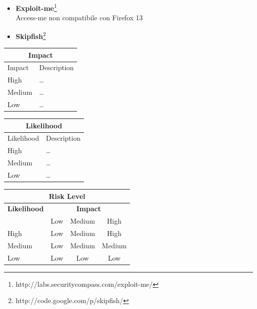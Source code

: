 \documentclass{article}
\begin{document}
\begin{itemize}
Sono state individuate in tutto 57 vulnerabilità.
Ognuna delle vulnerabilità segnala che, ad una richiesta particolare, il server ha risposto con un codice d'errore \emph{500}\footnote{Questo codice d'errore indica un errore generico avvenuto sul server a seguito di una richiesta impossibile da risolvere(Internal server error).}.

\item \textbf{Exploit-me}\footnote{http://labs.securitycompass.com/exploit-me/}\\
Access-me non compatibile con Firefox 13
\item \textbf{Skipfish}\footnote{http://code.google.com/p/skipfish/}\\

\end{itemize}

\begin{center}
\begin{tabular}{|l|l|}
\hline
\multicolumn{2}{|c|}{\bf Impact} \\
\hline
Impact & Description \\
\hline
\hline
High   & \hspace*{20pt}\ldots \\
\hline
Medium & \hspace*{20pt}\ldots \\
\hline
Low   & \hspace*{20pt}\ldots \\
\hline
\end{tabular}
%
%
\begin{tabular}{|l|l|}
\hline
\multicolumn{2}{|c|}{\bf Likelihood} \\
\hline
Likelihood & Description \\
\hline
\hline
High   & \hspace*{20pt}\ldots \\
\hline
Medium & \hspace*{20pt}\ldots \\
\hline
Low   & \hspace*{20pt}\ldots \\
\hline
\end{tabular}
\end{center}

\vspace{5mm}

\begin{center}
\begin{tabular}{|l|c|c|c|}
\hline
\multicolumn{4}{|c|}{{\bf Risk Level}} \\
\hline
{{\bf Likelihood}} & \multicolumn{3}{c|}{{\bf Impact}} \\ %
     & Low & Medium & High \\  \hline
 High & Low & Medium & High  \\
\hline
 Medium & Low & Medium & Medium \\
\hline
 Low & Low & Low & Low \\
\hline
\end{tabular}
\end{center}
\end{document}
